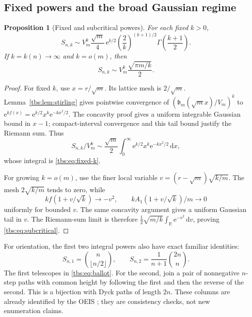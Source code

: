 \documentclass[11pt,a4paper]{article}
\numberwithin{equation}{section}
\newtheorem{proposition}[theorem]{Proposition}
\theoremstyle{definition}
\newcommand{\R}{\mathbb R}
\newcommand{\bcont}{\mathfrak b}
\newcommand{\dd}{\,\mathrm d}
\newcommand{\ee}{\mathrm e}
\begin{document}
\subsection{Fixed powers and the broad Gaussian regime}
\begin{proposition}[Fixed and subcritical powers]\label{tbs:prop:subcritical}
For each fixed $k>0$,
\begin{equation}\label{tbs:eq:fixed-k}
 S_{n,k}\sim V_m^k\frac{\sqrt m}{4}\,
 \ee^{k/2}\left(\frac2k\right)^{(k+1)/2}
 \Gamma\!\left(\frac{k+1}{2}\right).
\end{equation}
If $k=k(n)\to\infty$ and $k=o(m)$, then
\begin{equation}\label{tbs:eq:subcritical}
 S_{n,k}\sim V_m^k\frac{\sqrt{\pi m/k}}2.
\end{equation}
\end{proposition}
\begin{proof}
For fixed $k$, use $x=r/\sqrt m$. Its lattice mesh is $2/\sqrt m$.
Lemma~\ref{tbs:lem:stirling} gives pointwise convergence of
$(\bcont_m(\sqrt m x)/V_m)^k$ to
$\ee^{kf(x)}=\ee^{k/2}x^k\ee^{-kx^2/2}$. The concavity proof gives a
uniform integrable Gaussian bound in $x-1$; compact-interval convergence
and this tail bound justify the Riemann sum. Thus
\[
 S_{n,k}/V_m^k\sim\frac{\sqrt m}{2}\int_0^\infty
          \ee^{k/2}x^k\ee^{-kx^2/2}\dd x,
\]
whose integral is \eqref{tbs:eq:fixed-k}.

For growing $k=o(m)$, use the finer local variable
$v=(r-\sqrt m)\sqrt{k/m}$. The mesh $2\sqrt{k/m}$ tends to zero,
while
\[
 kf(1+v/\sqrt k)\longrightarrow-v^2,
 \qquad kA_1(1+v/\sqrt k)/m\longrightarrow0
\]
uniformly for bounded $v$. The same concavity argument gives a uniform
Gaussian tail in $v$. The Riemann-sum limit is therefore
$\frac12\sqrt{m/k}\int_{\R}\ee^{-v^2}\dd v$, proving
\eqref{tbs:eq:subcritical}.
\end{proof}

For orientation, the first two integral powers also have exact familiar
identities:
\[
 S_{n,1}=\binom{n}{\lfloor n/2\rfloor},\qquad
 S_{n,2}=\frac1{n+1}\binom{2n}{n}.
\]
The first telescopes in \eqref{tbs:eq:ballot}. For the second, join a pair of
nonnegative $n$-step paths with common height by following the first and
then the reverse of the second. This is a bijection with Dyck paths of
length $2n$. These columns are already identified by the OEIS
\cite{oeisarray}; they are consistency checks, not new enumeration claims.
\end{document}
